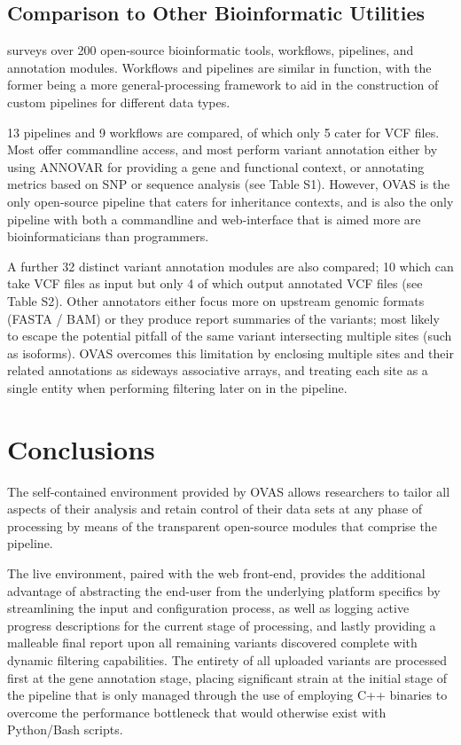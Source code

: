 \documentclass[twocolumn]{bmcart}%
\def\app{OVAS}
\newcommand{\horia}[1]{{\color{magenta} #1}}
\newcounter{changeCount}
\newcommand{\changes}[1]{
		\stepcounter{changeCount}
		{\tiny\bf\color{violet}\arabic{changeCount}}
		{\color{red} #1}
	}
\newcommand{\horia}[1]{#1}
\newcommand{\changes}[1]{#1}
\begin{document}
\changes{
\subsection{Comparison to Other Bioinformatic Utilities}

\citeauthor{pabinger2014survey} surveys over 200 \horia{open-source} bioinformatic tools, workflows, pipelines, and annotation modules. Workflows and pipelines are similar in function, with the former being a more general-processing framework to aid in the construction of custom pipelines for different data types.

13 pipelines and 9 workflows are compared, of which only 5 cater for VCF files. Most offer commandline access, and most perform variant annotation either by using ANNOVAR \cite{wang2010annovar} for providing a gene and functional context, or annotating metrics based on SNP or sequence analysis (see Table S1). However, \app{} is the only open-source pipeline that caters for inheritance contexts, and is also the only pipeline with both a commandline and web-interface that is aimed more are bioinformaticians than programmers.

A further 32 distinct variant annotation modules are also compared; 10 which can take VCF files as input but only 4 of which output annotated VCF files (see Table S2). Other annotators either focus more on upstream genomic formats (FASTA / BAM) or they produce report summaries of the variants; most likely to escape the potential pitfall of the same  variant intersecting multiple sites \horia{(such as isoforms)}. \app{} overcomes this limitation by enclosing multiple sites and their related annotations as sideways associative arrays, and treating each site as a single entity when performing filtering later on in the pipeline. 
}



\section*{Conclusions}

The self-contained environment provided by \app{} allows researchers to tailor all aspects of their analysis and retain control of their data sets at any phase of processing by means of the transparent open-source modules that comprise the pipeline. 

The live environment, paired with the web front-end, provides the additional advantage of abstracting the end-user from the underlying platform specifics by streamlining the input and configuration process, as well as logging active progress descriptions for the current stage of processing, and lastly providing a malleable final report upon all remaining variants discovered complete with dynamic filtering capabilities. The entirety of all uploaded variants are processed first at the gene annotation stage, placing significant strain at the initial stage of the pipeline that is only managed through the use of employing C++ binaries to overcome the performance bottleneck that would otherwise exist with Python/Bash scripts.
\end{document}
